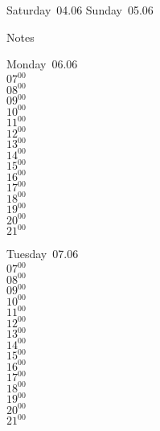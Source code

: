 \documentclass[11pt,a4paper]{book}\usepackage[]{graphicx}\usepackage[]{color}
\begin{document}
\begin{weekendbox}
  Saturday~04.06
  \tcblower
  Sunday~05.06
\end{weekendbox} %
\begin{notebox}
  Notes
\end{notebox}
\clearpage
\begin{headerbox}
\end{headerbox}
\begin{weekdaybox}
  Monday~06.06\\
  { 
  \vfill
  $07^{00}$\\
$08^{00}$\\
$09^{00}$\\
$10^{00}$\\
$11^{00}$\\
$12^{00}$\\
$13^{00}$\\
$14^{00}$\\
$15^{00}$\\
$16^{00}$\\
$17^{00}$\\
$18^{00}$\\
$19^{00}$\\
$20^{00}$\\
$21^{00}$\\
  }
\end{weekdaybox}
\begin{weekdaybox}
  Tuesday~07.06\\
  { 
  \vfill
  $07^{00}$\\
$08^{00}$\\
$09^{00}$\\
$10^{00}$\\
$11^{00}$\\
$12^{00}$\\
$13^{00}$\\
$14^{00}$\\
$15^{00}$\\
$16^{00}$\\
$17^{00}$\\
$18^{00}$\\
$19^{00}$\\
$20^{00}$\\
$21^{00}$\\
  }
\end{weekdaybox}
\end{document}
